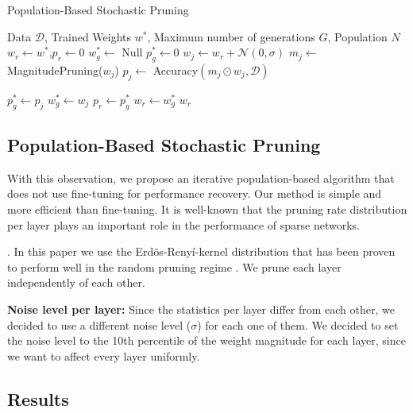 \begin{algorithm}[!tb]
   \caption{Population-Based Stochastic Pruning}
   \label{alg:PBRP}
   \begin{algorithmic}[1]
     Data $\mathcal{D} $, Trained Weights $w^*$, Maximum number of generations $G$, Population $N$
     $w_r \gets w^*$,$p_r \gets 0$ 
    \STATE{}
   \STATE $w^*_g \gets$ Null
   \STATE $p^*_{g} \gets0$ 
   \STATE $w_j \gets w_r+ \mathcal{N}(0,\sigma)$ 
   \STATE $m_j \gets$ MagnitudePruning($w_j$)
   \STATE $p_j \gets$ Accuracy$(m_j\odot w_j,\mathcal{D})$

   \STATE $p^*_g\gets p_j$
   \STATE $w^*_g \gets w_j$
   \ENDIF
   \ENDFOR
   \STATE $p_r \gets p^*_g$
   \STATE $w_r \gets w^*_g$
   \ENDIF
   \ENDFOR
   \OUTPUT $w_r$
\end{algorithmic}
\end{algorithm}

\subsection{Population-Based Stochastic Pruning}
With this observation, we propose an iterative population-based algorithm that does not use fine-tuning for performance recovery. Our method is simple and more efficient than fine-tuning.
It is well-known that the pruning rate distribution per layer plays an important role in the performance of sparse networks.

\cite{leeLayeradaptiveSparsityMagnitudebased2022}. In this paper we use  the Erdös-Renyí-kernel distribution \cite{evciRiggingLotteryMaking2020} that has been proven to perform well in the random pruning regime \cite{liuUnreasonableEffectivenessRandom2022}. We prune each layer independently of each other.

\textbf{Noise level per layer:}
Since the statistics per layer differ from each other, we decided to use a different noise level ($\sigma$) for each one of them. We decided to set the noise level to the 10th percentile of the weight magnitude for each layer, since we want to affect every layer uniformly.
\subsection{Results}

